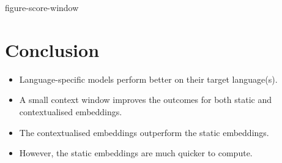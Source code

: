 {figure-score-window}

\section{Conclusion}

\begin{itemize}
  \item Language-specific models perform better on their target language(s).
  \item A small context window improves the outcomes for both static and contextualised embeddings.
  \item The contextualised embeddings outperform the static embeddings.
  \item However, the static embeddings are much quicker to compute.
\end{itemize}
